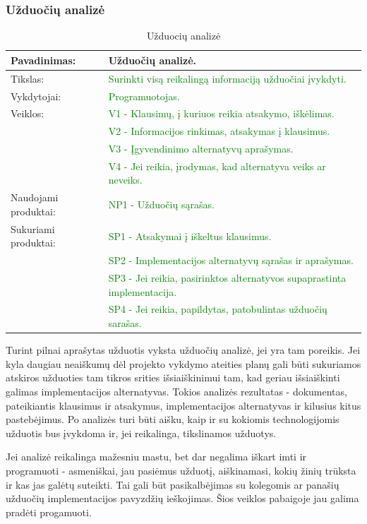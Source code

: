 \documentclass{VUMIFPSkursinis}
\begin{document}
	\subsubsection{Užduočių analizė}
	\begin{center}
		\begin{table}[ht]
			\caption{Užduocių analizė}
			\begin{tabular}{ | l | l | }
				\hline
				Pavadinimas:         & Užduočių analizė.								\\ \hline
				Tikslas:             & \textcolor{green}{Surinkti visą reikalingą informaciją užduočiai įvykdyti.}			\\ \hline
				Vykdytojai:          & \textcolor{green}{Programuotojas.}								\\ \hline
				Veiklos:             & \textcolor{green}{V1 - Klausimų, į kuriuos reikia atsakymo, iškėlimas.	}			\\
				                     & \textcolor{green}{V2 - Informacijos rinkimas, atsakymas į klausimus.}				\\
				                     & \textcolor{green}{V3 - Įgyvendinimo alternatyvų aprašymas.}					\\
				                     & \textcolor{green}{V4 - Jei reikia, įrodymas, kad alternatyva veiks ar neveiks.}			\\ \hline
				Naudojami produktai: & \textcolor{green}{NP1 - Užduočių sąrašas. }							\\ \hline
				Sukuriami produktai: & \textcolor{green}{SP1 - Atsakymai į iškeltus klausimus.}						\\
				                     & \textcolor{green}{SP2 - Implementacijos alternatyvų sąrašas ir aprašymas.	}		\\
				                     & \textcolor{green}{SP3 - Jei reikia, pasirinktos alternatyvos supaprastinta implementacija.}	\\
				                     & \textcolor{green}{SP4 - Jei reikia, papildytas, patobulintas užduočių sarašas.}			\\ \hline
			\end{tabular}
		\end{table}
	\end{center}
	Turint pilnai aprašytas užduotis vyksta užduočių analizė, jei yra tam poreikis.
	Jei kyla daugiau neaiškumų dėl projekto vykdymo ateities planų gali būti sukuriamos atskiros užduoties tam tikros srities išsiaiškinimui tam, kad geriau išsiaiškinti galimas implementacijos alternatyvas.
	Tokios analizės rezultatas - dokumentas, pateikiantis klausimus ir atsakymus, implementacijos alternatyvas ir kilusius kitus pastebėjimus.
	Po analizės turi būti aišku, kaip ir su kokiomis technologijomis užduotis bus įvykdoma ir, jei reikalinga, tikslinamos užduotys.
	\par
	Jei analizė reikalinga mažesniu mastu, bet dar negalima iškart imti ir programuoti - asmeniškai, jau pasiėmus užduotį, aiškinamasi, kokių žinių trūksta ir kas jas galėtų suteikti.
	Tai gali būt pasikalbėjimas su kolegomis ar panašių užduočių implementacijos pavyzdžių ieškojimas.
	Šios veiklos pabaigoje jau galima pradėti progamuoti.
\end{document}
